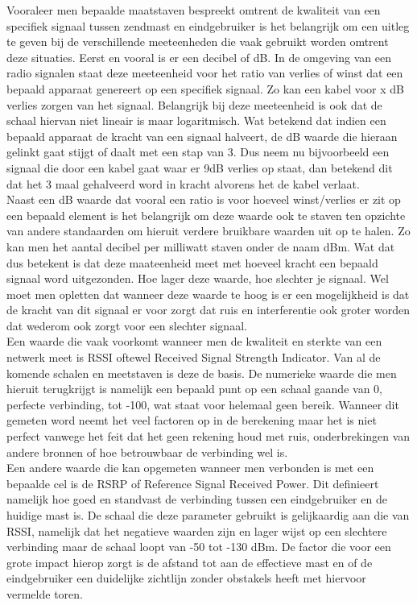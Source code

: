 Vooraleer men bepaalde maatstaven bespreekt omtrent de kwaliteit van een specifiek signaal tussen zendmast en eindgebruiker is het belangrijk om een uitleg te geven bij de verschillende meeteenheden die vaak gebruikt worden omtrent deze situaties. Eerst en vooral is er een decibel of dB. In de omgeving van een radio signalen staat deze meeteenheid voor het ratio van verlies of winst dat een bepaald apparaat genereert op een specifiek signaal. Zo kan een kabel voor x dB verlies zorgen van het signaal. Belangrijk bij deze meeteenheid is ook dat de schaal hiervan niet lineair is maar logaritmisch. Wat betekend dat indien een bepaald apparaat de kracht van een signaal halveert, de dB waarde die hieraan gelinkt gaat stijgt of daalt met een stap van 3. Dus neem nu bijvoorbeeld een signaal die door een kabel gaat waar er 9dB verlies op staat, dan betekend dit dat het 3 maal gehalveerd word in kracht alvorens het de kabel verlaat. \autocite{Young2004} \\

Naast een dB waarde dat vooral een ratio is voor hoeveel winst/verlies er zit op een bepaald element is het belangrijk om deze waarde ook te staven ten opzichte van andere standaarden om hieruit verdere bruikbare waarden uit op te halen. Zo kan men het aantal decibel per milliwatt staven onder de naam dBm. Wat dat dus betekent is dat deze maateenheid meet met hoeveel kracht een bepaald signaal word uitgezonden. Hoe lager deze waarde, hoe slechter je signaal. Wel moet men opletten dat wanneer deze waarde te hoog is er een mogelijkheid is dat de kracht van dit signaal er voor zorgt dat ruis en interferentie ook groter worden dat wederom ook zorgt voor een slechter signaal. \autocite{Hardesty2023} \\

Een waarde die vaak voorkomt wanneer men de kwaliteit en sterkte van een netwerk meet is RSSI oftewel Received Signal Strength Indicator. Van al de komende schalen en meetstaven is deze de basis. De numerieke waarde die men hieruit terugkrijgt is namelijk een bepaald punt op een schaal gaande van 0, perfecte verbinding, tot -100, wat staat voor helemaal geen bereik. Wanneer dit gemeten word neemt het veel factoren op in de berekening maar het is niet perfect vanwege het feit dat het geen rekening houd met ruis, onderbrekingen van andere bronnen of hoe betrouwbaar de verbinding wel is.  \autocite{Ramirez2023} \\

Een andere waarde die kan opgemeten wanneer men verbonden is met een bepaalde cel is de RSRP of Reference Signal Received Power. Dit definieert namelijk hoe goed en standvast de verbinding tussen een eindgebruiker en de huidige mast is. De schaal die deze parameter gebruikt is gelijkaardig aan die van RSSI, namelijk dat het negatieve waarden zijn en lager wijst op een slechtere verbinding maar de schaal loopt van -50 tot -130 dBm. De factor die voor een grote impact hierop zorgt is de afstand tot aan de effectieve mast en of de eindgebruiker een duidelijke zichtlijn zonder obstakels heeft met hiervoor vermelde toren. \autocite{Ramirez2023} \\

